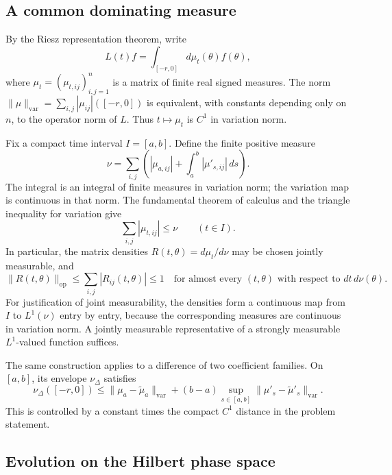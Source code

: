 \documentclass[11pt,a4paper]{article}
\theoremstyle{remark}
\begin{document}
\subsection{A common dominating measure}

By the Riesz representation theorem, write
\[
 L(t)f=\int_{[-r,0]}d\mu_t(\theta)f(\theta),
\]
where $\mu_t=(\mu_{t,ij})_{i,j=1}^n$ is a matrix of finite real signed
measures. The norm
$\|\mu\|_{\mathrm{var}}=\sum_{i,j}|\mu_{ij}|([-r,0])$ is equivalent,
with constants depending only on $n$, to the operator norm of $L$.
Thus $t\mapsto\mu_t$ is $C^1$ in variation norm.

Fix a compact time interval $I=[a,b]$. Define the finite positive measure
\[
 \nu=\sum_{i,j}\left(
 |\mu_{a,ij}|+\int_a^b|\mu'_{s,ij}|\,ds\right).
 \tag{921.2}\label{eq:921-envelope}
\]
The integral is an integral of finite measures in variation norm; the
variation map is continuous in that norm. The fundamental theorem of
calculus and the triangle inequality for variation give
\[
 \sum_{i,j}|\mu_{t,ij}|\le\nu\qquad(t\in I).
 \tag{921.3}\label{eq:921-domination}
\]
In particular, the matrix densities $R(t,\theta)=d\mu_t/d\nu$ may be
chosen jointly measurable, and
\[
 \|R(t,\theta)\|_{\mathrm{op}}
 \le\sum_{i,j}|R_{ij}(t,\theta)|\le1
 \quad\text{for almost every }(t,\theta)
 \text{ with respect to }dt\,d\nu(\theta).
\]
For justification of joint measurability, the densities form a continuous
map from $I$ to $L^1(\nu)$ entry by entry, because the corresponding
measures are continuous in variation norm. A jointly measurable
representative of a strongly measurable $L^1$-valued function suffices.

The same construction applies to a difference of two coefficient
families. On $[a,b]$, its envelope $\nu_\Delta$ satisfies
\[
 \nu_\Delta([-r,0])
 \le\|\mu_a-\widetilde\mu_a\|_{\mathrm{var}}
 +(b-a)\sup_{s\in[a,b]}
          \|\mu'_s-\widetilde\mu'_s\|_{\mathrm{var}}.
 \tag{921.4}\label{eq:921-difference-envelope}
\]
This is controlled by a constant times the compact $C^1$ distance in the
problem statement.

\subsection{Evolution on the Hilbert phase space}
\end{document}
